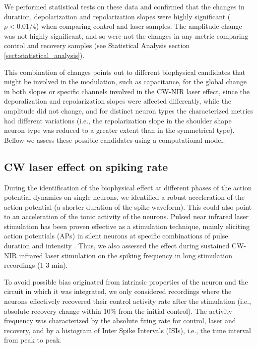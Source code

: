 We performed statistical tests on these data and confirmed that the changes in duration, depolarization and repolarization slopes were highly significant ($\rho < 0.01 /4$) when comparing control and laser samples. The amplitude change was not highly significant, and so were not the changes in any metric comparing control and recovery samples (see Statistical Analysis section \ref{sect:statistical_analysis}).

This combination of changes points out to different biophysical candidates that might be involved in the modulation, such as capacitance, for the global change in both slopes or specific channels involved in the CW-NIR laser effect, since the deporalization and repolarization slopes were affected differently, while the amplitude did not change, and for distinct neuron types the characterized metrics had different variations (i.e., the repolarization slope in the shoulder shape neuron type was reduced to a greater extent than in the symmetrical type). Bellow we assess these possible candidates using a computational model. 

\subsection{CW laser effect on spiking rate}
During the identification of the biophysical effect at different phases of the action potential dynamics on single neurons, we identified a robust acceleration of the action potential (a shorter duration of the spike waveform). This could also point to an acceleration of the tonic activity of the neurons. Pulsed near infrared laser stimulation has been proven effective as a stimulation technique, mainly eliciting action potentials (APs) in silent neurons at specific combinations of pulse duration and intensity \cite{Wells2005, Shapiro2012, Izzo2007, Cayce2014}. Thus, we also assessed the effect during sustained CW-NIR infrared laser stimulation on the spiking frequency in long stimulation recordings (1-3 min). 

To avoid possible bias originated from intrinsic properties of the neuron and the circuit in which it was integrated, we only considered recordings where the neurons effectively recovered their control activity rate after the stimulation (i.e., absolute recovery change within 10\% from the initial control). The activity frequency was characterized by the absolute firing rate for control, laser and recovery, and by a histogram of Inter Spike Intervals (ISIs), i.e., the time interval from peak to peak.

